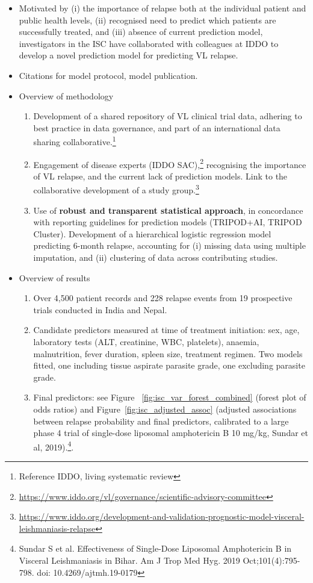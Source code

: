 \documentclass[11pt,a4paper]{article} %
\begin{document}
\begin{itemize}
  \item Motivated by (i) the importance of relapse both at the individual patient and public health levels, (ii) recognised need to predict which patients are successfully treated, and (iii) absence of current prediction model, investigators in the ISC have collaborated with colleagues at IDDO to develop a novel prediction model for predicting VL relapse.
  \item Citations for model protocol, model publication.
  \item Overview of methodology
        \begin{enumerate}
          \item Development of a shared repository of VL clinical trial data, adhering to best practice in data governance, and part of an international data sharing collaborative.\footnote{Reference IDDO, living systematic review}
          \item Engagement of disease experts (IDDO SAC),\footnote{\url{https://www.iddo.org/vl/governance/scientific-advisory-committee}} recognising the importance of VL relapse, and the current lack of prediction models. Link to the collaborative development of a study group.\footnote{\url{https://www.iddo.org/development-and-validation-prognostic-model-visceral-leishmaniasis-relapse}}
          \item Use of \textbf{robust and transparent statistical approach}, in concordance with reporting guidelines for prediction models (TRIPOD+AI, TRIPOD Cluster). Development of a hierarchical logistic regression model predicting 6-month relapse, accounting for (i) missing data using multiple imputation, and (ii) clustering of data across contributing studies.
        \end{enumerate}
  \item Overview of results
        \begin{enumerate}
          \item Over 4,500 patient records and 228 relapse events from 19 prospective trials conducted in India and Nepal.
          \item Candidate predictors measured at time of treatment initiation: sex, age, laboratory tests (ALT, creatinine, WBC, platelets), anaemia, malnutrition, fever duration, spleen size, treatment regimen. Two models fitted, one including tissue aspirate parasite grade, one excluding parasite grade.
          \item Final predictors: see Figure ~\ref{fig:isc_var_forest_combined} (forest plot of odds ratios) and Figure~\ref{fig:isc_adjusted_assoc} (adjusted associations between relapse probability and final predictors, calibrated to a large phase 4 trial of single-dose liposomal amphotericin B 10 mg/kg, Sundar et al, 2019).\footnote{Sundar S et al. Effectiveness of Single-Dose Liposomal Amphotericin B in Visceral Leishmaniasis in Bihar. Am J Trop Med Hyg. 2019 Oct;101(4):795-798. doi: 10.4269/ajtmh.19-0179}.

\end{enumerate}
\end{itemize}
\end{document}
